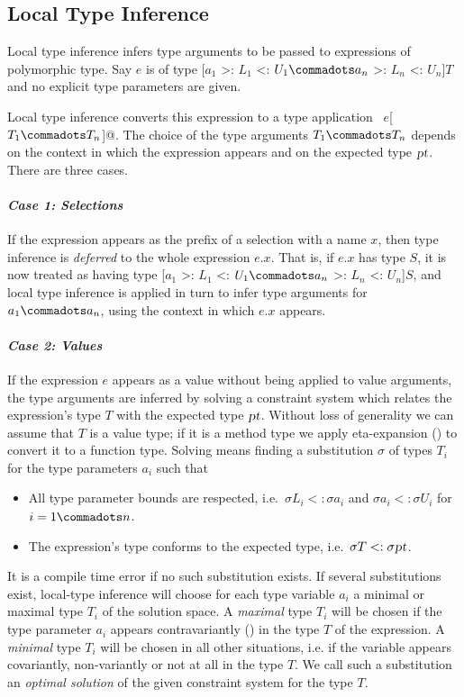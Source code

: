 \subsection{Local Type Inference}
\label{sec:local-type-inf}

Local type inference infers type arguments to be passed to expressions
of polymorphic type. Say $e$ is of type [$a_1$ >: $L_1$ <: $U_1
\commadots a_n$ >: $L_n$ <: $U_n$]$T$ and no explicit type parameters
are given. 

Local type inference converts this expression to a type
application ~\lstinline@$e$[$T_1 \commadots T_n$]@. The choice of the
type arguments $T_1 \commadots T_n$ depends on the context in which
the expression appears and on the expected type $\mbox{\sl pt}$. 
There are three cases.

\paragraph{\em Case 1: Selections}
If the expression appears as the prefix of a selection with a name
$x$, then type inference is {\em deferred} to the whole expression
$e.x$. That is, if $e.x$ has type $S$, it is now treated as having
type [$a_1$ >: $L_1$ <: $U_1 \commadots a_n$ >: $L_n$ <: $U_n$]$S$,
and local type inference is applied in turn to infer type arguments 
for $a_1 \commadots a_n$, using the context in which $e.x$ appears.

\paragraph{\em Case 2: Values}
If the expression $e$ appears as a value without being applied to
value arguments, the type arguments are inferred by solving a
constraint system which relates the expression's type $T$ with the
expected type $\mbox{\sl pt}$. Without loss of generality we can assume that
$T$ is a value type; if it is a method type we apply eta-expansion
() to convert it to a function type.  Solving
means finding a substitution $\sigma$ of types $T_i$ for the type
parameters $a_i$ such that
\begin{itemize}
\item 
All type parameter bounds are respected, i.e.\ 
$\sigma L_i <: \sigma a_i$ and $\sigma a_i <: \sigma U_i$ for $i = 1 \commadots n$.
\item 
The expression's type conforms to the expected type, i.e.\ 
$\sigma T <: \sigma \mbox{\sl pt}$.
\end{itemize}
It is a compile time error if no such substitution exists.  
If several substitutions exist, local-type inference will choose for
each type variable $a_i$ a minimal or maximal type $T_i$ of the
solution space.  A {\em maximal} type $T_i$ will be chosen if the type
parameter $a_i$ appears contravariantly (\sref{sec:variances}) in the
type $T$ of the expression.  A {\em minimal} type $T_i$ will be chosen
in all other situations, i.e. if the variable appears covariantly,
non-variantly or not at all in the type $T$. We call such a substitution
an {\em optimal solution} of the given constraint system for the type $T$.


